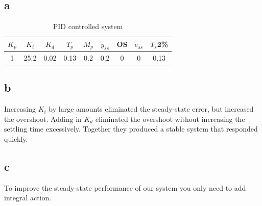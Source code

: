\documentclass{article}
\begin{document}
\subsection*{a} %
\begin{table}[!htbp]
\centering
    \begin{tabular}{|c|c|c|c|c|c|c|c|c|}
        \hline
        $K_p$ & $K_i$ & $K_d$ & $T_p$ & $M_p$ & $y_{ss}$ & OS & $e_{ss}$ & $T_s$2\% \\
        \hline
        1 & 25.2 & 0.02 & 0.13 & 0.2 & 0.2 & 0 & 0 & 0.13\\
        \hline
    \end{tabular}
    \caption{PID controlled system}
\end{table}
\subsection*{b} %
Increasing $K_i$ by large amounts eliminated the steady-state error, but increased the overshoot. Adding in $K_d$ eliminated the overshoot without increasing the settling time excessively. Together they produced a stable system that responded quickly.

\subsection*{c} %
To improve the steady-state performance of our system you only need to add integral action.



\end{document}
